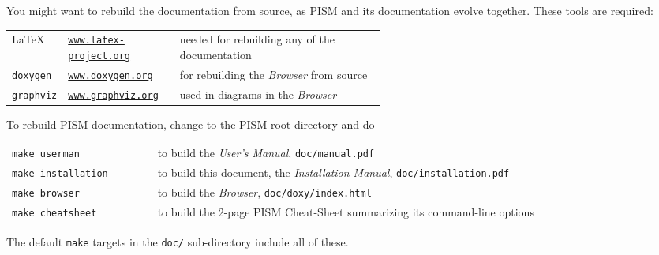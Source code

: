 \documentclass[11pt,final]{amsart}
\renewcommand{\t}[1]{\texttt{#1}}
\begin{document}
You might want to rebuild the documentation from source, as PISM and its documentation evolve together.  These tools are required:
\bigskip
\begin{center}
  \begin{tabular*}{0.9\linewidth}{llp{0.55\linewidth}}
    \toprule
    \LaTeX & \href{http://www.latex-project.org/}{\t{www.latex-project.org}} &  needed for rebuilding any of the documentation \\
    \texttt{doxygen}\index{doxygen} & \href{http://www.stack.nl/~dimitri/doxygen/}{\t{www.doxygen.org}} &  for rebuilding the \emph{Browser} from source  \\
    \texttt{graphviz}\index{graphviz} & \href{http://www.graphviz.org/}{\t{www.graphviz.org}} &  used in diagrams in the \emph{Browser}  \\
    \bottomrule
  \end{tabular*}
\end{center}
\bigskip
\noindent To rebuild PISM documentation, change to the PISM root directory and do
\begin{center}
  \begin{tabular}{p{0.25\linewidth}p{0.7\linewidth}}
    \texttt{make userman} & to build the \emph{User's Manual}, \texttt{doc/manual.pdf}\\
    \texttt{make installation} & to build this document, the \emph{Installation Manual}, \texttt{doc/installation.pdf}\\
    \texttt{make browser} & to build the \emph{Browser}, \texttt{doc/doxy/index.html}\\
    \texttt{make cheatsheet} & to build the 2-page PISM Cheat-Sheet summarizing its command-line options\\
  \end{tabular}
\end{center}
The default \texttt{make} targets in the \texttt{doc/} sub-directory include all of these.
\end{document}

